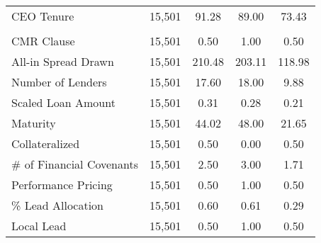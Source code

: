 {\begin{tabular}{l*{1}{cccc}}
CEO Tenure          &      15,501&       91.28&       89.00&       73.43\\
\addlinespace \multicolumn{5}{l}{\textbf{Loan Characteristics}} \\ CMR Clause          &      15,501&        0.50&        1.00&        0.50\\
All-in Spread Drawn &      15,501&      210.48&      203.11&      118.98\\
Number of Lenders   &      15,501&       17.60&       18.00&        9.88\\
Scaled Loan Amount  &      15,501&        0.31&        0.28&        0.21\\
Maturity            &      15,501&       44.02&       48.00&       21.65\\
Collateralized      &      15,501&        0.50&        0.00&        0.50\\
\# of Financial Covenants&      15,501&        2.50&        3.00&        1.71\\
Performance Pricing &      15,501&        0.50&        1.00&        0.50\\
\% Lead Allocation  &      15,501&        0.60&        0.61&        0.29\\
Local Lead          &      15,501&        0.50&        1.00&        0.50\\
\bottomrule
\end{tabular}
}
